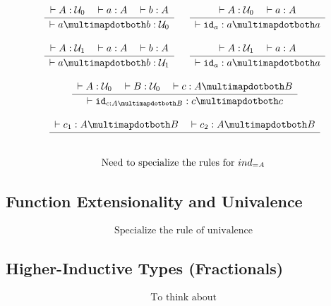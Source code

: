 \documentclass[format=acmlarge,review,natbib]{acmart}
\newcommand{\idc}{\mathtt{id}}
\newcommand{\iso}{\multimapdotboth}
\newcommand{\uzero}{\mathcal{U}_0}
\newcommand{\uone}{\mathcal{U}_1}
\newcommand{\Rule}[2]{
\makebox{
$\displaystyle
\frac{\begin{array}{l}#1\\\end{array}}
{\begin{array}{l}#2\\\end{array}}$}}
\newcommand{\proves}{\vdash}
\newcommand{\jdg}[3]{#1 \proves #2 : #3}
\begin{document}
\[\begin{array}{c}
\Rule{\jdg{}{A}{\uzero}
         \quad\jdg{}{a}{A}
         \quad\jdg{}{b}{A}}
        {\jdg{}{a \iso b}{\uzero}}
\quad
\Rule{\jdg{}{A}{\uzero}
          \quad\jdg{}{a}{A}}
         {\jdg{}{\idc_{a}}{a \iso a}}
\\
\\
\Rule{\jdg{}{A}{\uone}
         \quad\jdg{}{a}{A}
         \quad\jdg{}{b}{A}}
        {\jdg{}{a \iso b}{\uone}}
\quad
\Rule{\jdg{}{A}{\uone}
          \quad\jdg{}{a}{A}}
         {\jdg{}{\idc_{a}}{a \iso a}}
\\
\\
\Rule{\jdg{}{A}{\uzero}
         \quad\jdg{}{B}{\uzero}
         \quad\jdg{}{c}{A \iso B}}
         {\jdg{}{\idc_{c:A\iso B}}{c \iso c}}
\\
\\
\Rule{\jdg{}{c_1}{A \iso B}
         \quad\jdg{}{c_2}{A \iso B}}
         {}
\\
\\
\mbox{Need to specialize the rules for } ind_{=A}
\end{array}\]

\subsection{Function Extensionality and Univalence}

\[\begin{array}{c}
\mbox{Specialize the rule of univalence}
\end{array}\]

\subsection{Higher-Inductive Types (Fractionals)}

\[\begin{array}{c}
\mbox{To think about}
\end{array}\]


{\footnotesize

}
\end{document}
